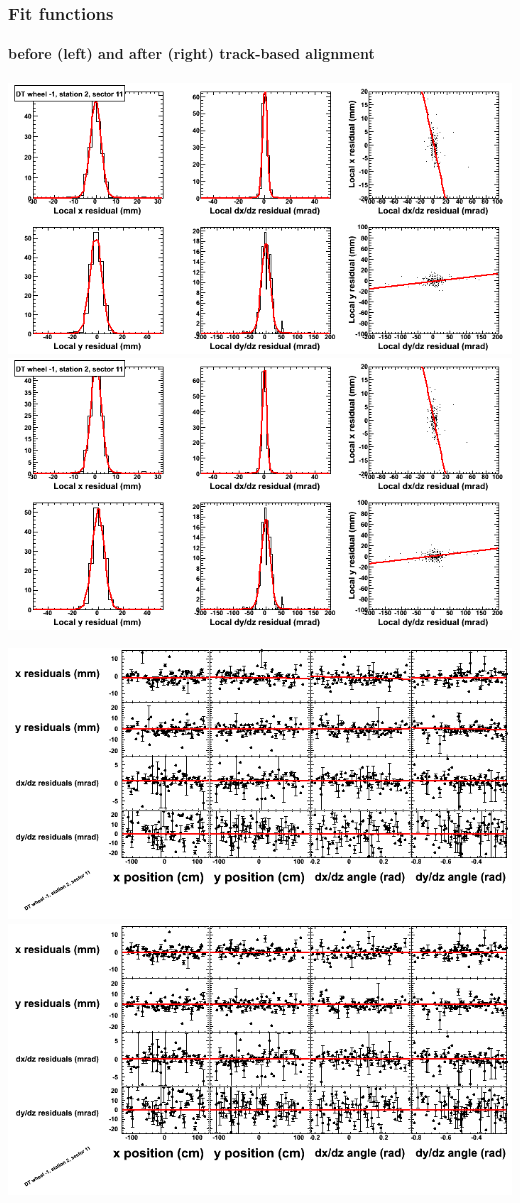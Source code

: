 \documentclass[compress]{beamer}
\begin{document}
\begin{frame}
\frametitle{Fit functions}
\framesubtitle{before (left) and after (right) track-based alignment}
\includegraphics[width=0.5\linewidth]{fitfunctions_re01/MBwhBst2sec11_bellcurves.png} \includegraphics[width=0.5\linewidth]{fitfunctions_re05/MBwhBst2sec11_bellcurves.png}

\includegraphics[width=0.5\linewidth]{fitfunctions_re01/MBwhBst2sec11_polynomials.png} \includegraphics[width=0.5\linewidth]{fitfunctions_re05/MBwhBst2sec11_polynomials.png}
\end{frame}
\end{document}
